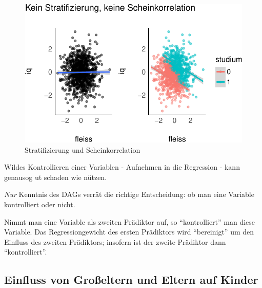 \documentclass[
  a4paper,
  DIV=11]{scrreprt}
\theoremstyle{definition}
\theoremstyle{remark}
\begin{document}
\begin{figure}

{\centering \includegraphics{./kausal_files/figure-pdf/fig-eignung-strat-1.pdf}

}

\caption{\label{fig-eignung-strat}Stratifizierung und Scheinkorrelation}

\end{figure}

Wildes Kontrollieren einer Variablen - Aufnehmen in die Regression -
kann genausog ut schaden wie nützen.

\emph{Nur} Kenntnis des DAGs verrät die richtige Entscheidung: ob man
eine Variable kontrolliert oder nicht.

\begin{tcolorbox}[enhanced jigsaw, title=\textcolor{quarto-callout-note-color}{\faInfo}\hspace{0.5em}{Hinweis}, bottomtitle=1mm, bottomrule=.15mm, titlerule=0mm, colbacktitle=quarto-callout-note-color!10!white, colframe=quarto-callout-note-color-frame, leftrule=.75mm, left=2mm, toprule=.15mm, colback=white, arc=.35mm, breakable, toptitle=1mm, opacityback=0, rightrule=.15mm, coltitle=black, opacitybacktitle=0.6]

Nimmt man eine Variable als zweiten Prädiktor auf, so ``kontrolliert''
man diese Variable. Das Regressiongewicht des ersten Prädiktors wird
``bereinigt'' um den Einfluss des zweiten Prädiktors; insofern ist der
zweite Prädiktor dann ``kontrolliert''.

\end{tcolorbox}

\hypertarget{einfluss-von-grouxdfeltern-und-eltern-auf-kinder}{%
\subsection{Einfluss von Großeltern und Eltern auf
Kinder}\label{einfluss-von-grouxdfeltern-und-eltern-auf-kinder}}
\end{document}
